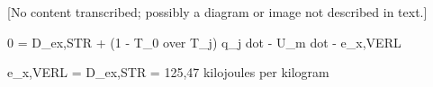[No content transcribed; possibly a diagram or image not described in text.]

0 = D_ex,STR + (1 - T_0 over T_j) q_j dot - U_m dot - e_x,VERL

e_x,VERL = D_ex,STR = 125,47 kilojoules per kilogram